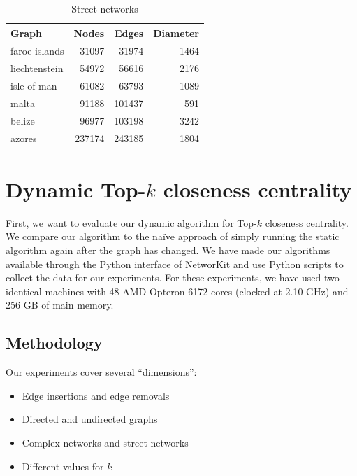 \begin{table}[h!]
\centering
\begin{tabular}{lrrr}
\hline
 Graph         &   Nodes &   Edges &   Diameter \\
\hline
 faroe-islands &   31097 &   31974 &       1464 \\
 liechtenstein &   54972 &   56616 &       2176 \\
 isle-of-man   &   61082 &   63793 &       1089 \\
 malta         &   91188 &  101437 &        591 \\
 belize        &   96977 &  103198 &       3242 \\
 azores        &  237174 &  243185 &       1804 \\
\hline
\end{tabular}
\caption{Street networks}
\label{tbl:streetNetworks}

\end{table}


\FloatBarrier

\section{Dynamic Top-$k$ closeness centrality}
First, we want to evaluate our dynamic algorithm for Top-$k$ closeness centrality. We compare our algorithm to the na\"ive approach of simply running the static algorithm again after the graph has changed. We have made our algorithms available through the Python interface of NetworKit and use Python scripts to collect the data for our experiments. For these experiments, we have used two identical machines with 48 AMD Opteron 6172 cores (clocked at 2.10 GHz) and 256 GB of main memory.

\subsection{Methodology}
Our experiments cover several ``dimensions'':

\begin{itemize}
	\item Edge insertions and edge removals
	\item Directed and undirected graphs
	\item Complex networks and street networks
	\item Different values for $k$
\end{itemize}

